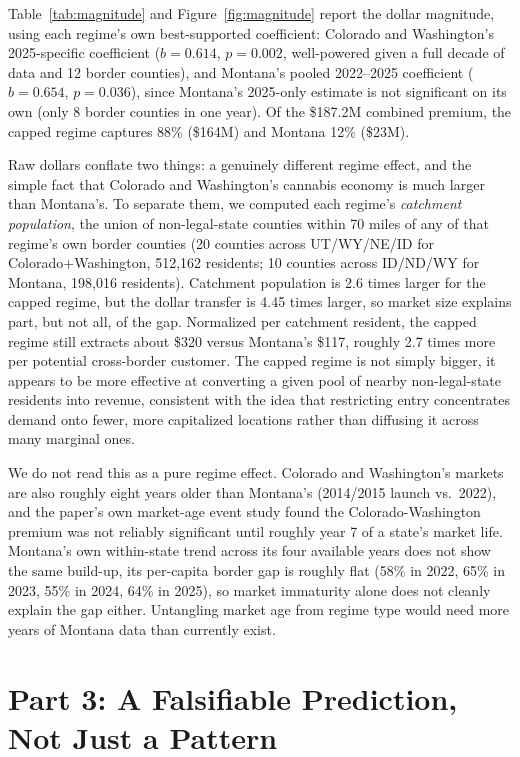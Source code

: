 \documentclass[11pt]{article}
\begin{document}
Table~\ref{tab:magnitude} and Figure~\ref{fig:magnitude} report the dollar magnitude, using each regime's
own best-supported coefficient: Colorado and Washington's 2025-specific coefficient ($b=0.614$,
$p=0.002$, well-powered given a full decade of data and 12 border counties), and Montana's pooled
2022--2025 coefficient ($b=0.654$, $p=0.036$), since Montana's 2025-only estimate is not significant on
its own (only 8 border counties in one year). Of the \$187.2M combined premium, the capped regime
captures 88\% (\$164M) and Montana 12\% (\$23M).

Raw dollars conflate two things: a genuinely different regime effect, and the simple fact that Colorado
and Washington's cannabis economy is much larger than Montana's. To separate them, we computed each
regime's \emph{catchment population}, the union of non-legal-state counties within 70 miles of any of
that regime's own border counties (20 counties across UT/WY/NE/ID for Colorado+Washington, 512{,}162
residents; 10 counties across ID/ND/WY for Montana, 198{,}016 residents). Catchment population is 2.6
times larger for the capped regime, but the dollar transfer is 4.45 times larger, so market size explains
part, but not all, of the gap. Normalized per catchment resident, the capped regime still extracts about
\$320 versus Montana's \$117, roughly 2.7 times more per potential cross-border customer. The capped
regime is not simply bigger, it appears to be more effective at converting a given pool of nearby
non-legal-state residents into revenue, consistent with the idea that restricting entry concentrates
demand onto fewer, more capitalized locations rather than diffusing it across many marginal ones.

We do not read this as a pure regime effect. Colorado and Washington's markets are also roughly eight
years older than Montana's (2014/2015 launch vs.\ 2022), and the paper's own market-age event study found
the Colorado-Washington premium was not reliably significant until roughly year 7 of a state's market
life. Montana's own within-state trend across its four available years does not show the same
build-up, its per-capita border gap is roughly flat (58\% in 2022, 65\% in 2023, 55\% in 2024, 64\% in
2025), so market immaturity alone does not cleanly explain the gap either. Untangling market age from
regime type would need more years of Montana data than currently exist.

\section{Part 3: A Falsifiable Prediction, Not Just a Pattern}
\label{sec:prediction}
\end{document}
